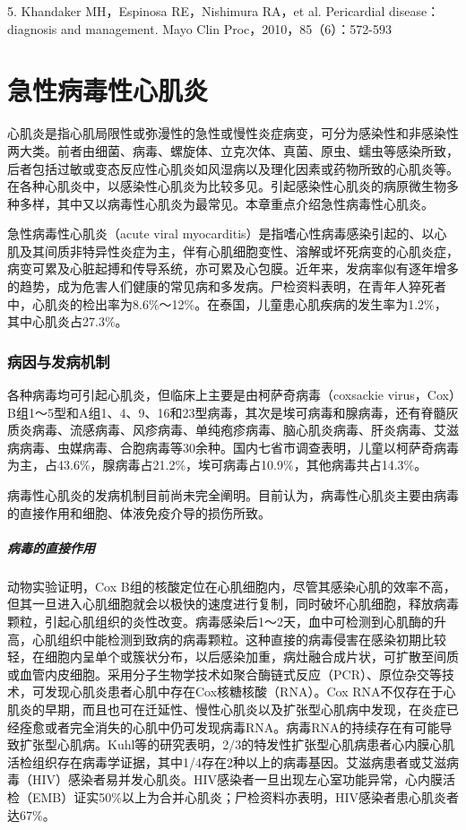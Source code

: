 5. Khandaker MH，Espinosa RE，Nishimura RA，et al. Pericardial
disease：diagnosis and management. Mayo Clin
Proc，2010，85（6）：572-593

\protect\hypertarget{text00304.html}{}{}

\chapter{急性病毒性心肌炎}

心肌炎是指心肌局限性或弥漫性的急性或慢性炎症病变，可分为感染性和非感染性两大类。前者由细菌、病毒、螺旋体、立克次体、真菌、原虫、蠕虫等感染所致，后者包括过敏或变态反应性心肌炎如风湿病以及理化因素或药物所致的心肌炎等。在各种心肌炎中，以感染性心肌炎为比较多见。引起感染性心肌炎的病原微生物多种多样，其中又以病毒性心肌炎为最常见。本章重点介绍急性病毒性心肌炎。

急性病毒性心肌炎（acute viral
myocarditis）是指嗜心性病毒感染引起的、以心肌及其间质非特异性炎症为主，伴有心肌细胞变性、溶解或坏死病变的心肌炎症，病变可累及心脏起搏和传导系统，亦可累及心包膜。近年来，发病率似有逐年增多的趋势，成为危害人们健康的常见病和多发病。尸检资料表明，在青年人猝死者中，心肌炎的检出率为8.6\%～12\%。在泰国，儿童患心肌疾病的发生率为1.2\%，其中心肌炎占27.3\%。

\subsection{病因与发病机制}

各种病毒均可引起心肌炎，但临床上主要是由柯萨奇病毒（coxsackie
virus，Cox）B组1～5型和A组1、4、9、16和23型病毒，其次是埃可病毒和腺病毒，还有脊髓灰质炎病毒、流感病毒、风疹病毒、单纯疱疹病毒、脑心肌炎病毒、肝炎病毒、艾滋病病毒、虫媒病毒、合胞病毒等30余种。国内七省市调查表明，儿童以柯萨奇病毒为主，占43.6\%，腺病毒占21.2\%，埃可病毒占10.9\%，其他病毒共占14.3\%。

病毒性心肌炎的发病机制目前尚未完全阐明。目前认为，病毒性心肌炎主要由病毒的直接作用和细胞、体液免疫介导的损伤所致。

\paragraph{病毒的直接作用}

动物实验证明，Cox
B组的核酸定位在心肌细胞内，尽管其感染心肌的效率不高，但其一旦进入心肌细胞就会以极快的速度进行复制，同时破坏心肌细胞，释放病毒颗粒，引起心肌组织的炎性改变。病毒感染后1～2天，血中可检测到心肌酶的升高，心肌组织中能检测到致病的病毒颗粒。这种直接的病毒侵害在感染初期比较轻，在细胞内呈单个或簇状分布，以后感染加重，病灶融合成片状，可扩散至间质或血管内皮细胞。采用分子生物学技术如聚合酶链式反应（PCR）、原位杂交等技术，可发现心肌炎患者心肌中存在Cox核糖核酸（RNA）。Cox
RNA不仅存在于心肌炎的早期，而且也可在迁延性、慢性心肌炎以及扩张型心肌病中发现，在炎症已经痊愈或者完全消失的心肌中仍可发现病毒RNA。病毒RNA的持续存在有可能导致扩张型心肌病。Kuhl等的研究表明，2/3的特发性扩张型心肌病患者心内膜心肌活检组织存在病毒学证据，其中1/4存在2种以上的病毒基因。艾滋病患者或艾滋病毒（HIV）感染者易并发心肌炎。HIV感染者一旦出现左心室功能异常，心内膜活检（EMB）证实50\%以上为合并心肌炎；尸检资料亦表明，HIV感染者患心肌炎者达67\%。

